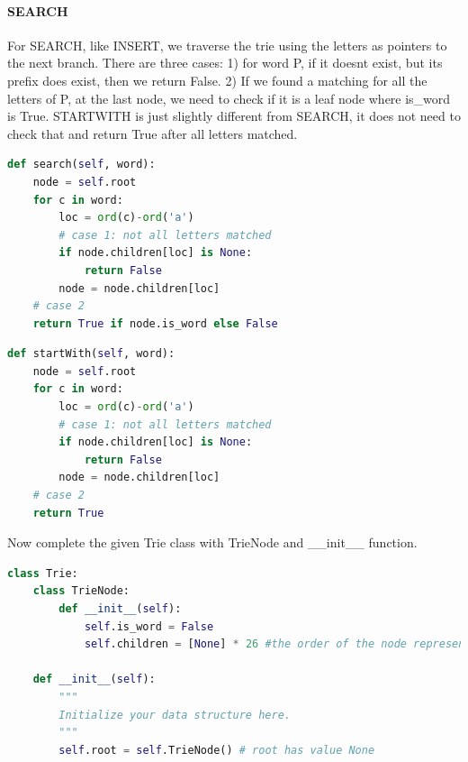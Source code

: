 \documentclass[../main.tex]{subfiles}
\begin{document}
\begin{examples}
\paragraph{SEARCH} For SEARCH, like INSERT, we traverse the trie using the letters as pointers to the next branch. There are three cases: 1) for word P, if it doesnt exist, but its prefix does exist, then we return False. 2) If we found a matching for all the letters of P, at the last node, we need to check if it is a leaf node where is\_word is True.  STARTWITH is just slightly different from SEARCH, it does not need to check that and return True after all letters matched. 
\begin{lstlisting}[language=Python]
def search(self, word):
    node = self.root
    for c in word:
        loc = ord(c)-ord('a')
        # case 1: not all letters matched 
        if node.children[loc] is None: 
            return False          
        node = node.children[loc]
    # case 2
    return True if node.is_word else False
\end{lstlisting}
\begin{lstlisting}[language=Python]
def startWith(self, word):
    node = self.root
    for c in word:
        loc = ord(c)-ord('a')
        # case 1: not all letters matched 
        if node.children[loc] is None: 
            return False          
        node = node.children[loc]
    # case 2
    return True
\end{lstlisting}
Now complete the given Trie class with TrieNode and \_\_init\_\_ function.
\begin{lstlisting}[language=Python]
class Trie:
    class TrieNode:
        def __init__(self):
            self.is_word = False
            self.children = [None] * 26 #the order of the node represents a char

    def __init__(self):
        """
        Initialize your data structure here.
        """
        self.root = self.TrieNode() # root has value None       
\end{lstlisting}
\end{examples}
\end{document}
